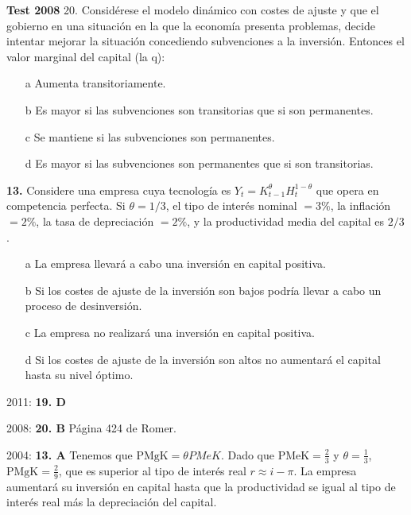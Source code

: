 \documentclass{nuevotema}
\begin{document}
\textbf{Test 2008}
20. Considérese el modelo dinámico con costes de ajuste y que el gobierno en una situación en la que la economía presenta problemas, decide intentar mejorar la situación concediendo subvenciones a la inversión. Entonces el valor marginal del capital (la q):

\begin{enumerate}
    \item[a] Aumenta transitoriamente.
    \item[b] Es mayor si las subvenciones son transitorias que si son permanentes.
    \item[c] Se mantiene si las subvenciones son permanentes.
    \item[d] Es mayor si las subvenciones son permanentes que si son transitorias.
\end{enumerate}


\textbf{13.} Considere una empresa cuya tecnología es $Y_t = K^\theta_{t-1} H^{1-\theta}_t$ que opera en competencia perfecta. Si $\theta=1/3$, el tipo de interés nominal $=3\%$, la inflación $=2\%$, la tasa de depreciación $=2\%$, y la productividad media del capital es $2/3$. 

\begin{itemize}
	\item[a] La empresa llevará a cabo una inversión en capital positiva.
	\item[b] Si los costes de ajuste de la inversión son bajos podría llevar a cabo un proceso de desinversión.
	\item[c] La empresa no realizará una inversión en capital positiva.
	\item[d] Si los costes de ajuste de la inversión son altos no aumentará el capital hasta su nivel óptimo.
\end{itemize}

\notas

2011: \textbf{19. D}

2008: \textbf{20. B} Página 424 de Romer.

2004: \textbf{13. A} Tenemos que $\text{PMgK} = \theta PMeK$. Dado que $\text{PMeK} = \frac{2}{3}$ y $\theta = \frac{1}{3}$,  $\text{PMgK}=\frac{2}{9}$, que es superior al tipo de interés real $r \approx i - \pi$. La empresa aumentará su inversión en capital hasta que la productividad se igual al tipo de interés real más la depreciación del capital.
\end{document}
